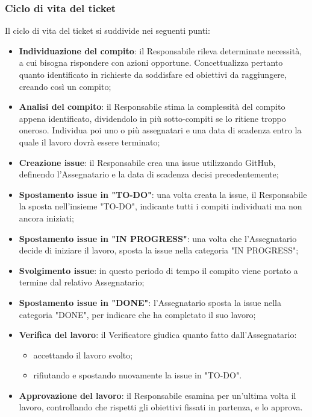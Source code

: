 \subsubsection{Ciclo di vita del ticket}
Il ciclo di vita del ticket si suddivide nei seguenti punti:
\begin {itemize}
    \item \textbf{Individuazione del compito}: il Responsabile rileva determinate necessità, a cui bisogna rispondere con azioni opportune. Concettualizza pertanto quanto identificato in richieste da soddisfare ed obiettivi da raggiungere, creando così un compito;
    \item \textbf{Analisi del compito}: il Responsabile stima la complessità del compito appena identificato, dividendolo in più sotto-compiti se lo ritiene troppo oneroso. Individua poi uno o più assegnatari e una data di scadenza entro la quale il lavoro dovrà essere terminato;
    \item \textbf{Creazione issue}: il Responsabile crea una issue utilizzando GitHub, definendo l’Assegnatario e la data di scadenza decisi precedentemente;
    \item \textbf{Spostamento issue in "TO-DO"}: una volta creata la issue, il Responsabile la sposta nell’insieme "TO-DO", indicante tutti i compiti individuati ma non ancora iniziati;
    \item \textbf{Spostamento issue in "IN PROGRESS"}: una volta che l’Assegnatario decide di iniziare il lavoro, sposta la issue nella categoria "IN PROGRESS";
    \item \textbf{Svolgimento issue}: in questo periodo di tempo il compito viene portato a termine dal relativo Assegnatario;
    \item \textbf{Spostamento issue in "DONE"}: l’Assegnatario sposta la issue nella categoria "DONE", per indicare che ha completato il suo lavoro;
    \item \textbf{Verifica del lavoro}: il Verificatore giudica quanto fatto dall’Assegnatario:
    \begin {itemize}
        \item accettando il lavoro svolto;
        \item rifiutando e spostando nuovamente la issue in "TO-DO".
    \end {itemize}
    \item \textbf{Approvazione del lavoro}: il Responsabile esamina per un’ultima volta il lavoro, controllando che rispetti gli obiettivi fissati in partenza, e lo approva.
\end {itemize}